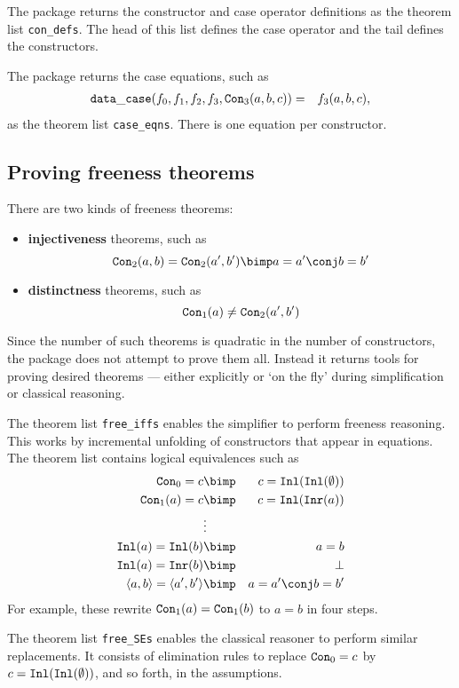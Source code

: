 The package returns the constructor and case operator definitions as the
theorem list \verb|con_defs|.  The head of this list defines the case
operator and the tail defines the constructors. 

The package returns the case equations, such as 
\begin{eqnarray*}
  {\tt data\_case}(f_0,f_1,f_2,f_3,{\tt Con}_3(a,b,c)) & = & f_3(a,b,c),
\end{eqnarray*}
as the theorem list \verb|case_eqns|.  There is one equation per constructor.

\subsection{Proving freeness theorems}
There are two kinds of freeness theorems:
\begin{itemize}
\item {\bf injectiveness} theorems, such as
\[ \Con_2(a,b) = \Con_2(a',b') \bimp a=a' \conj b=b' \]

\item {\bf distinctness} theorems, such as
\[ {\tt Con}_1(a) \not= {\tt Con}_2(a',b')  \]
\end{itemize}
Since the number of such theorems is quadratic in the number of constructors,
the package does not attempt to prove them all.  Instead it returns tools for
proving desired theorems --- either explicitly or `on the fly' during
simplification or classical reasoning.

The theorem list \verb|free_iffs| enables the simplifier to perform freeness
reasoning.  This works by incremental unfolding of constructors that appear in
equations.  The theorem list contains logical equivalences such as
\begin{eqnarray*}
  \Con_0=c      & \bimp &  c=\Inl(\Inl(\emptyset))     \\
  \Con_1(a)=c   & \bimp &  c=\Inl(\Inr(a))             \\
                & \vdots &                             \\
  \Inl(a)=\Inl(b)   & \bimp &  a=b                     \\
  \Inl(a)=\Inr(b)   & \bimp &  \bot                    \\
  \pair{a,b} = \pair{a',b'} & \bimp & a=a' \conj b=b'
\end{eqnarray*}
For example, these rewrite ${\tt Con}_1(a)={\tt Con}_1(b)$ to $a=b$ in four steps.

The theorem list \verb|free_SEs| enables the classical
reasoner to perform similar replacements.  It consists of elimination rules
to replace ${\tt Con}_0=c$ by $c={\tt Inl}({\tt Inl}(\emptyset))$, and so forth, in the
assumptions.

